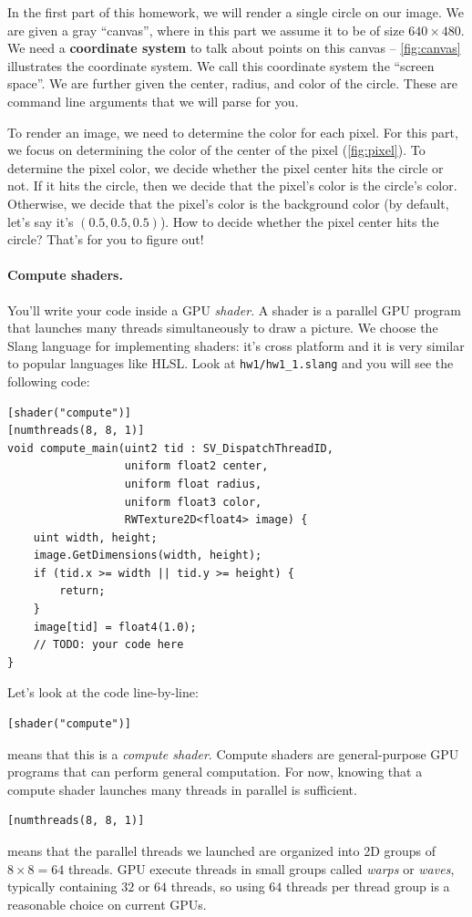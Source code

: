 In the first part of this homework, we will render a single circle on our image. We are given a gray ``canvas'', where in this part we assume it to be of size $640 \times 480$. We need a \textbf{coordinate system} to talk about points on this canvas -- \cref{fig:canvas} illustrates the coordinate system. We call this coordinate system the ``screen space''.
We are further given the center, radius, and color of the circle. These are command line arguments that we will parse for you.

To render an image, we need to determine the color for each pixel. For this part, we focus on determining the color of the center of the pixel (\cref{fig:pixel}). To determine the pixel color, we decide whether the pixel center hits the circle or not. If it hits the circle, then we decide that the pixel's color is the circle's color. Otherwise, we decide that the pixel's color is the background color (by default, let's say it's $(0.5, 0.5, 0.5)$). How to decide whether the pixel center hits the circle? That's for you to figure out!

\paragraph{Compute shaders.}
You'll write your code inside a GPU \emph{shader}. A shader is a parallel GPU program that launches many threads simultaneously to draw a picture. We choose the Slang language for implementing shaders: it's cross platform and it is very similar to popular languages like HLSL. Look at \lstinline{hw1/hw1_1.slang} and you will see the following code:
\begin{lstlisting}[language=Slang]
[shader("compute")]
[numthreads(8, 8, 1)]
void compute_main(uint2 tid : SV_DispatchThreadID,
                  uniform float2 center,
                  uniform float radius,
                  uniform float3 color,
                  RWTexture2D<float4> image) {
    uint width, height;
    image.GetDimensions(width, height);
    if (tid.x >= width || tid.y >= height) {
        return;
    }
    image[tid] = float4(1.0);
    // TODO: your code here
}
\end{lstlisting}

Let's look at the code line-by-line:
\begin{lstlisting}[language=Slang]
[shader("compute")]
\end{lstlisting}
means that this is a \emph{compute shader}. Compute shaders are general-purpose GPU programs that can perform general computation.
For now, knowing that a compute shader launches many threads in parallel is sufficient.
\begin{lstlisting}[language=Slang]
[numthreads(8, 8, 1)]
\end{lstlisting}
means that the parallel threads we launched are organized into 2D groups of $8 \times 8=64$ threads. 
GPU execute threads in small groups called \emph{warps} or \emph{waves}, typically containing $32$ or $64$ threads,
so using $64$ threads per thread group is a reasonable choice on current GPUs.

